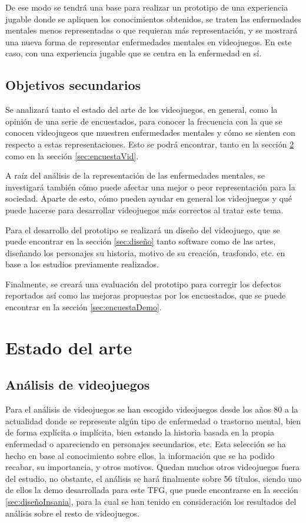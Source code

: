 \documentclass[12pt, a4paper,twoside,titlepage]{book}
\begin{document}
    De ese modo se tendrá una base para realizar un prototipo de una experiencia jugable donde se apliquen los conocimientos obtenidos, se traten las enfermedades mentales menos representadas o que requieran más representación, y se mostrará una nueva forma de representar enfermedades mentales en videojuegos. En este caso, con una experiencia jugable que se centra en la enfermedad en sí.
    
   
    \section{Objetivos secundarios}
    
     Se analizará tanto el estado del arte de los videojuegos, en general, como la opinión de una serie de encuestados, para conocer la frecuencia con la que se conocen videojugeos que muestren enfermedades mentales y cómo se sienten con respecto a estas representaciones. Esto se podrá encontrar, tanto en la sección \ref{sec:estadoArte} como en la sección \ref{sec:encuestaVid}.       
       
     A raíz del análisis de la representación de las enfermedades mentales, se investigará también cómo puede afectar una mejor o peor representación para la sociedad. Aparte de esto, cómo pueden ayudar en general los videojuegos y qué puede hacerse para desarrollar videojuegos más correctos al tratar este tema.   
     
     Para el desarrollo del prototipo se realizará un diseño del videojuego, que se puede encontrar en la sección \ref{sec:diseño} tanto software como de las artes, diseñando los personajes su historia, motivo de su creación, trasfondo, etc. en base a los estudios previamente realizados. 
     
     Finalmente, se creará una evaluación del prototipo para corregir los defectos reportados así como las mejoras propuestas por los encuestados, que se puede encontrar en la sección \ref{sec:encuestaDemo}. 
  
\chapter{Estado del arte}
\label{sec:estadoArte}
\section{Análisis de videojuegos}

Para el análisis de videojuegos se han escogido videojuegos desde los años 80 a la actualidad donde se represente algún tipo de enfermedad o trastorno mental, bien de forma explícita o implícita, bien estando la historia basada en la propia enfermedad o apareciendo en personajes secundarios, etc. Esta selección se ha hecho en base al conocimiento sobre ellos, la información que se ha podido recabar, su importancia, y otros motivos. Quedan muchos otros videojuegos fuera del estudio, no obstante, el análisis se hará finalmente sobre 56 títulos, siendo uno de ellos la demo desarrollada para este TFG, que puede encontrarse en la sección \ref{sec:diseñoInsania}, para la cual se han tenido en consideración los resultados del análisis sobre el resto de videojuegos. 
\end{document}
